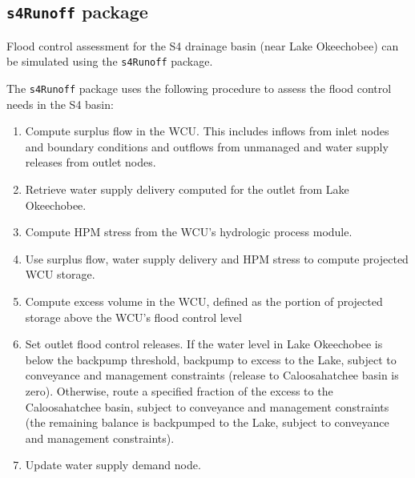 \subsection{{\tt s4Runoff} package }

Flood control assessment for the S4 drainage basin (near Lake
Okeechobee) can be simulated using the {\tt s4Runoff} package. 

The {\tt s4Runoff} package uses the following procedure to assess the
flood control needs in the S4 basin:

\begin{enumerate}

 \item Compute surplus flow in the WCU.  This includes inflows from
   inlet nodes and boundary conditions and outflows from unmanaged and
   water supply releases from outlet nodes.

 \item Retrieve water supply delivery computed for the outlet from
   Lake Okeechobee.

 \item Compute HPM stress from the WCU's hydrologic process module.

 \item Use surplus flow, water supply delivery and HPM stress to
   compute projected WCU storage.

 \item Compute excess volume in the WCU, defined as the portion of
   projected storage above the WCU's flood control level

 \item Set outlet flood control releases.  If the water level in Lake
   Okeechobee is below the backpump threshold, backpump to excess to
   the Lake, subject to conveyance and management constraints (release
   to Caloosahatchee basin is zero).  Otherwise, route a specified
   fraction of the excess to the Caloosahatchee basin, subject to
   conveyance and management constraints (the remaining balance is
   backpumped to the Lake, subject to conveyance and management
   constraints).

 \item Update water supply demand node.

\end{enumerate}

